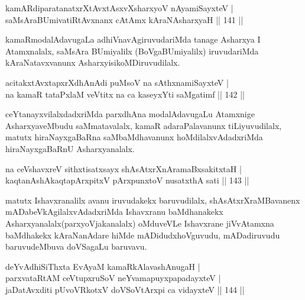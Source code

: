\begin{shl}
kamARdiparatanatxrXtAvxtAsxvXsharxyoV nAyamiSayxteV |\\
saMsAraBUmivatiRtAvxnanx cA\s \s tAmx kAraNAsharxyaH \hfill || 141 ||
\end{shl}

\begin{artha}
kamaRmodalAdavugaLa adhiVnavAgiruvudariMda tanage Asharxya I Atamxnalalx, saMsAra 
BUmiyalilx (BoVgaBUmiyalilx) iruvudariMda kAraNatavxvanunx AsharxyisikoMDiruvudilalx.
\end{artha}


\begin{shl}
acitakxtAvxtapxrXdhAnAdi puMsoV na sAthxnamiSayxteV |\\
na kamaR tataPxlaM veVtitx na ca kaseyxYti saMgatimf \hfill || 142 ||
\end{shl}

\begin{artha}
ceYtanayxvilalxdadxriMda parxdhAna modalAdavugaLu Atamxnige AsharxyaveMbudu saMmatavalalx, kamaR adaraPalavanunx tiLiyuvudilalx, matutx hiraNayxgaBaRna saMbaMdhavanunx hoMdilalxvAdadxriMda hiraNayxgaBaRnU Asharxyanalalx.
\end{artha}


\begin{shl}
na ceVshavxreV sithxtisatxsayx shAsAtxrXnAramaBxsakitxtaH |\\
kaqtanAshAkaqtapArxpitxV pArxpunxtoV nusatxthA sati \hfill || 143 ||
\end{shl}

\begin{artha}
matutx Ishavxranalilx avanu iruvudakekx baruvudilalx, shAsAtxrXraMBavanenx mADabeVkAgilalxvAdadxriMda Ishavxranu baMdhanakekx Asharxyanalalx(parxyoVjakanalalx) oMduveVLe Ishavxrane jiVvAtamxna baMdhakekx kAraNanAdare hiMde mADidudxhoVguvudu, mADadiruvudu baruvudeMbuva doVSagaLu baruvavu.
\end{artha}


\begin{shl}
deYvAdhiSiThxta EvAyaM kamaRkAlavashAnugaH |\\
parxvataRtAM ceVtupxruSoV neYvamapuyxpapadayxteV |\\
jaDatAvxditi pUvoVRkotxV doVSoV\s tArxpi ca vidayxteV \hfill || 144 ||
\end{shl}

